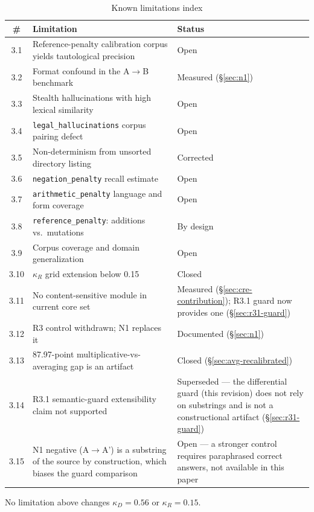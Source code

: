 \documentclass[11pt,a4paper]{article}
\begin{document}
\begin{table}[H]
\centering
\caption{Known limitations index}
\label{tab:limitations-index}
\begin{tabular}{@{}cp{7.3cm}p{4.5cm}@{}}
\toprule
\# & Limitation & Status \\
\midrule
3.1 & Reference-penalty calibration corpus yields tautological precision & Open \\
3.2 & Format confound in the A$\rightarrow$B benchmark & Measured (\S\ref{sec:n1}) \\
3.3 & Stealth hallucinations with high lexical similarity & Open \\
3.4 & \texttt{legal\_hallucinations} corpus pairing defect & Open \\
3.5 & Non-determinism from unsorted directory listing & Corrected \\
3.6 & \texttt{negation\_penalty} recall estimate & Open \\
3.7 & \texttt{arithmetic\_penalty} language and form coverage & Open \\
3.8 & \texttt{reference\_penalty}: additions vs.\ mutations & By design \\
3.9 & Corpus coverage and domain generalization & Open \\
3.10 & $\kappa_R$ grid extension below 0.15 & Closed \\
3.11 & No content-sensitive module in current core set & Measured (\S\ref{sec:cre-contribution}); R3.1 guard now provides one (\S\ref{sec:r31-guard}) \\
3.12 & R3 control withdrawn; N1 replaces it & Documented (\S\ref{sec:n1}) \\
3.13 & 87.97-point multiplicative-vs-averaging gap is an artifact & Closed (\S\ref{sec:avg-recalibrated}) \\
3.14 & R3.1 semantic-guard extensibility claim not supported & Superseded --- the differential guard (this revision) does not rely on substrings and is not a constructional artifact (\S\ref{sec:r31-guard}) \\
3.15 & N1 negative (A$\rightarrow$A') is a substring of the source by construction, which biases the guard comparison & Open --- a stronger control requires paraphrased correct answers, not available in this paper \\
\bottomrule
\end{tabular}
\end{table}

No limitation above changes $\kappa_D = 0.56$ or $\kappa_R = 0.15$.
\end{document}
